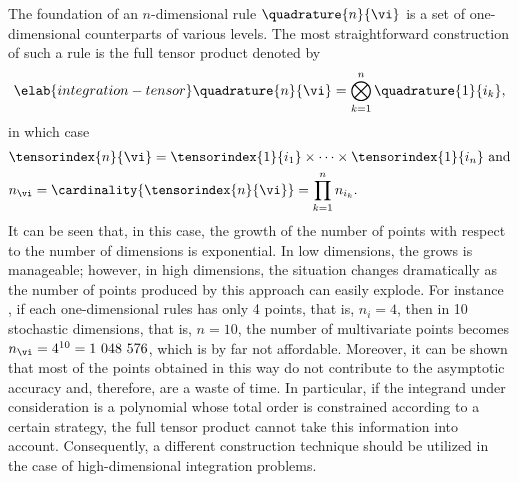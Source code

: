 The foundation of an $n$-dimensional rule $\quadrature{n}{\vi}$ is a set of
one-dimensional counterparts of various levels. The most straightforward
construction of such a rule is the full tensor product denoted by
\begin{equation} \elab{integration-tensor}
  \quadrature{n}{\vi} = \bigotimes_{k = 1}^n \quadrature{1}{i_k},
\end{equation}
in which case
\[
  \begin{split}
    & \tensorindex{n}{\vi} = \tensorindex{1}{i_1} \times \cdots \times \tensorindex{1}{i_n} \text{ and} \\
    & n_{\vi} = \cardinality{\tensorindex{n}{\vi}} = \prod_{k = 1}^n n_{i_k}.
  \end{split}
\]
It can be seen that, in this case, the growth of the number of points with
respect to the number of dimensions is exponential. In low dimensions, the grows
is manageable; however, in high dimensions, the situation changes dramatically
as the number of points produced by this approach can easily explode. For
instance \cite{heiss2008}, if each one-dimensional rules has only 4 points, that
is, $n_i = 4$, then in 10 stochastic dimensions, that is, $n = 10$, the number
of multivariate points becomes $n_{\vi} = 4^{10} = 1~048~576$, which is by far
not affordable. Moreover, it can be shown that most of the points obtained in
this way do not contribute to the asymptotic accuracy and, therefore, are a
waste of time. In particular, if the integrand under consideration is a
polynomial whose total order is constrained according to a certain strategy, the
full tensor product cannot take this information into account. Consequently, a
different construction technique should be utilized in the case of
high-dimensional integration problems.

